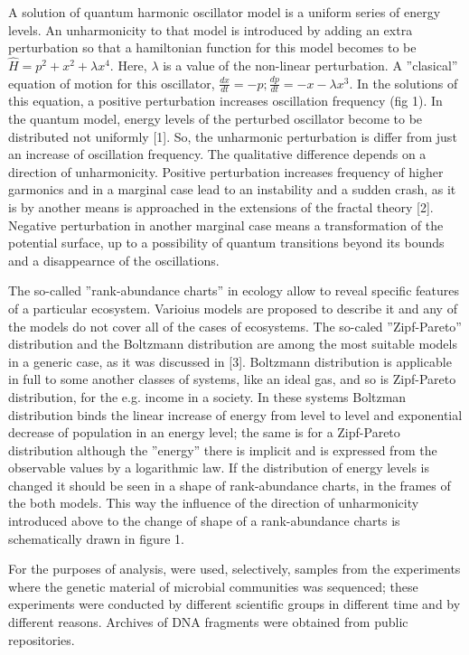 \documentclass[a4paper]{article}
\begin{document}
A solution of quantum harmonic oscillator model is a uniform series of energy levels. An unharmonicity to that model is introduced by adding an extra perturbation so that a hamiltonian function for this model becomes to be $\hat H = p^2 + x^2 + \lambda x^4$. Here, $\lambda$ is a value of the non-linear perturbation. A ''clasical'' equation of motion for this oscillator, $\frac{dx}{dt} = -p; \frac{dp}{dt} = -x -\lambda x^3$. In the solutions of this equation, a positive perturbation increases oscillation frequency (fig 1). In the quantum model, energy levels of the perturbed oscillator become to be distributed not uniformly [1]. So, the unharmonic perturbation is differ from just an increase of oscillation frequency. The qualitative difference depends on a direction of unharmonicity. Positive perturbation increases frequency of higher garmonics and in a marginal case lead to an instability and a sudden crash, as it is by another means is approached in the extensions of the fractal theory [2]. Negative perturbation in another marginal case means a transformation of the potential surface, up to a possibility of quantum transitions beyond its bounds and a disappearnce of the oscillations.  

The so-called ''rank-abundance charts'' in ecology allow to reveal specific features of a particular ecosystem. Varioius models are proposed to describe it and any of the models do not cover all of the cases of ecosystems. The so-caled ''Zipf-Pareto'' distribution and the Boltzmann distribution are among the most suitable models in a generic case, as it was discussed in [3]. Boltzmann distribution is applicable in full to some another classes of systems, like an ideal gas, and so is Zipf-Pareto distribution, for the e.g. income in a society. In these systems Boltzman distribution binds the linear increase of energy from level to level and exponential decrease of population in an energy level; the same is for a Zipf-Pareto distribution although the ''energy'' there is implicit and is expressed from the observable values by a logarithmic law. If the distribution of energy levels is changed it should be seen in a shape of rank-abundance charts, in the frames of the both models. This way the influence of the direction of unharmonicity introduced above to the change of shape of a rank-abundance charts is schematically drawn in figure 1.

For the purposes of analysis, were used, selectively, samples from the experiments where the genetic material of microbial communities was sequenced; these experiments were conducted by different scientific groups in different time and by different reasons. Archives of DNA fragments were obtained from public repositories.  
\end{document}
